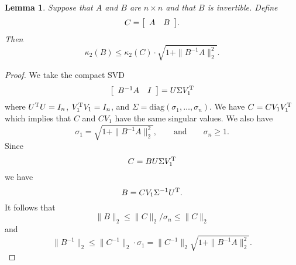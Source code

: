 \documentclass[12pt]{article}
\def\eqand{\qquad\mbox{and}\qquad}
\def\T{{\rm T}}
\def\diag{\mbox{diag}}
\newenvironment{mtx}[1]{\left[\begin{array}{#1}}{\end{array}\right]}
\newtheorem{lemma}{Lemma}
\begin{document}
\begin{lemma}
  Suppose that $A$ and $B$ are $n\times n$ and that $B$ is invertible.
  Define
  \begin{equation*}
    C = 
    \begin{mtx}{cc}
      A & B
    \end{mtx}.
  \end{equation*}
  Then
  \begin{equation*}
    \kappa_2(B) \leq \kappa_2(C) \cdot \sqrt{1 + \|B^{-1} A\|_2^2}.
  \end{equation*}
\end{lemma}
\begin{proof}
We take the compact SVD
\begin{equation*}
  \begin{mtx}{cc}
    B^{-1}A & I
  \end{mtx} = U \Sigma V_1^\T
\end{equation*}
where $U^\T U=I_n$, $V_1^\T V_1 = I_n$, and
$\Sigma = \diag(\sigma_1, \ldots, \sigma_n)$.  We have
$C = CV_1 V_1^\T$ which implies that $C$ and $CV_1$ have the same
singular values.  We also have
\begin{equation*}
  \sigma_1 = \sqrt{1 + \|B^{-1}A\|_2^2}, \eqand
  \sigma_n \geq 1.
\end{equation*}
Since
\begin{equation*}
  C = B U \Sigma V_1^\T
\end{equation*}
we have
\begin{equation*}
  B = CV_1 \Sigma^{-1} U^\T.
\end{equation*}
It follows that
\begin{equation*}
 \|B\|_2 \leq
 \|C\|_2 / \sigma_n \leq \|C\|_2
\end{equation*}
and
\begin{equation*}
  \|B^{-1}\|_2 \leq \|C^{-1}\|_2 \cdot \sigma_1 =
  \|C^{-1}\|_2 \sqrt{1+\|B^{-1}A\|_2^2}.
\end{equation*}
\end{proof}
\end{document}
